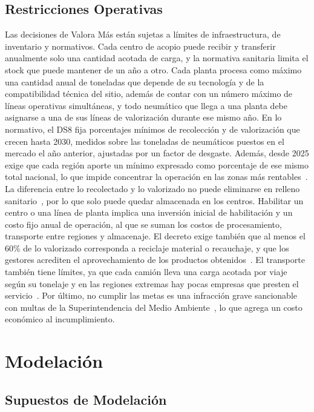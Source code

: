 \documentclass[letterpaper]{article}
\begin{document}
\subsection{Restricciones Operativas}

Las decisiones de Valora Más están sujetas a límites de infraestructura, de inventario y normativos. Cada centro de acopio puede recibir y transferir anualmente solo una cantidad acotada de carga, y la normativa sanitaria limita el stock que puede mantener de un año a otro. Cada planta procesa como máximo una cantidad anual de toneladas que depende de su tecnología y de la compatibilidad técnica del sitio, además de contar con un número máximo de líneas operativas simultáneas, y todo neumático que llega a una planta debe asignarse a una de sus líneas de valorización durante ese mismo año. En lo normativo, el DS8 fija porcentajes mínimos de recolección y de valorización que crecen hasta 2030, medidos sobre las toneladas de neumáticos puestos en el mercado el año anterior, ajustadas por un factor de desgaste. Además, desde 2025 exige que cada región aporte un mínimo expresado como porcentaje de ese mismo total nacional, lo que impide concentrar la operación en las zonas más rentables~\cite{DS8}. La diferencia entre lo recolectado y lo valorizado no puede eliminarse en relleno sanitario~\cite{paiscircular2026,kyklos2026}, por lo que solo puede quedar almacenada en los centros. Habilitar un centro o una línea de planta implica una inversión inicial de habilitación y un costo fijo anual de operación, al que se suman los costos de procesamiento, transporte entre regiones y almacenaje. El decreto exige también que al menos el 60\% de lo valorizado corresponda a reciclaje material o recauchaje, y que los gestores acrediten el aprovechamiento de los productos obtenidos~\cite{DS8}. El transporte también tiene límites, ya que cada camión lleva una carga acotada por viaje según su tonelaje y en las regiones extremas hay pocas empresas que presten el servicio~\cite{paiscircular2026}. Por último, no cumplir las metas es una infracción grave sancionable con multas de la Superintendencia del Medio Ambiente~\cite{leyrep20920}, lo que agrega un costo económico al incumplimiento.

\section{Modelación}
\subsection{Supuestos de Modelación}
\end{document}
